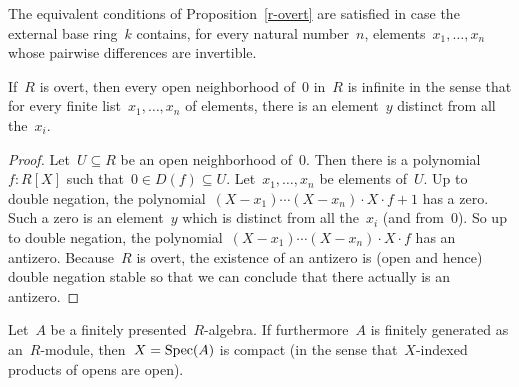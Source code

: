 \begin{remark}The equivalent conditions of Proposition~\ref{r-overt} are
satisfied in case the external base ring~$k$ contains, for every natural
number~$n$, elements~$x_1,\ldots,x_n$ whose pairwise differences are
invertible.\end{remark}

\begin{proposition}If~$R$ is overt, then every open neighborhood of~$0$ in~$R$
is infinite in the sense that for every finite list~$x_1,\ldots,x_n$ of
elements, there is an element~$y$ distinct from all the~$x_i$.
\end{proposition}

\begin{proof}Let~$U \subseteq R$ be an open neighborhood of~$0$. Then there is
a polynomial~$f : R[X]$ such that~$0 \in D(f) \subseteq U$.
Let~$x_1,\ldots,x_n$ be elements of~$U$. Up to double
negation, the polynomial~$(X-x_1)\cdots(X-x_n) \cdot X \cdot f + 1$ has a zero. Such a zero is an
element~$y$ which is distinct from all the~$x_i$ (and from~$0$). So up to
double negation, the polynomial~$(X-x_1)\cdots(X-x_n) \cdot X \cdot f$ has an
antizero. Because~$R$ is overt, the existence of an antizero is (open and
hence) double negation stable so that we can conclude that there actually is an
antizero.
\end{proof}

\begin{proposition}\label{finite-compact}
Let~$A$ be a finitely presented~$R$-algebra. If furthermore~$A$ is finitely
generated as an~$R$-module, then~$X = \operatorname{Spec}(A)$ is compact (in the sense
that~$X$-indexed products of opens are open).\end{proposition}

